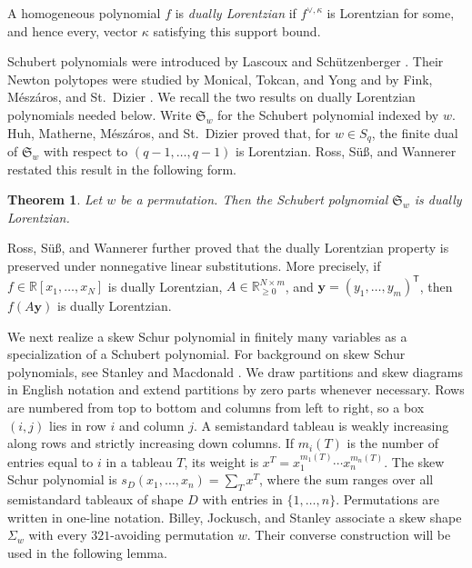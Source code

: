 \documentclass[11pt]{article}
\newtheorem{theorem}{Theorem}[section]
\theoremstyle{definition}
\newcommand{\Schubert}{\mathfrak S}
\newcommand{\R}{\mathbb R}
\begin{document}
A homogeneous polynomial $f$ is \emph{dually Lorentzian} if
$f^{\vee,\kappa}$ is Lorentzian for some, and hence every, vector $\kappa$
satisfying this support bound.

Schubert polynomials were introduced by Lascoux and Sch\"utzenberger
\cite{LS}.  Their Newton polytopes were studied by Monical, Tokcan, and Yong
\cite{MTY} and by Fink, M\'esz\'aros, and St.~Dizier \cite{FMSD}.  We recall
the two results on dually Lorentzian polynomials needed below.  Write
$\Schubert_w$ for the Schubert polynomial indexed by $w$.  Huh, Matherne,
M\'esz\'aros, and St.~Dizier \cite[Theorem~6]{HMMSD} proved that, for
$w\in S_q$, the finite dual of $\Schubert_w$ with respect to
$(q-1,\ldots,q-1)$ is Lorentzian.  Ross, S\"u\ss, and Wannerer
\cite[Theorem~4.5]{RSW} restated this result in the following form.

\begin{theorem}\label{thm:schubert-dual}
Let $w$ be a permutation.  Then the Schubert polynomial $\Schubert_w$ is
dually Lorentzian.
\end{theorem}

Ross, S\"u\ss, and Wannerer \cite[Theorem~5.12]{RSW} further proved that the
dually Lorentzian property is preserved under nonnegative linear
substitutions.  More precisely, if
$f\in\R[x_1,\ldots,x_N]$ is dually Lorentzian,
$A\in\R_{\ge0}^{N\times m}$, and
$\mathbf y=(y_1,\ldots,y_m)^{\mathsf T}$, then
$f(A\mathbf y)$ is dually Lorentzian.

We next realize a skew Schur polynomial in finitely many variables as a
specialization of a Schubert polynomial.  For background on skew Schur
polynomials, see Stanley \cite[Chapter~7]{StanleyEC2} and Macdonald
\cite[Chapter~I]{Macdonald}.  We draw partitions and skew diagrams in English
notation and extend partitions by zero parts whenever necessary.  Rows are
numbered from top to bottom and columns from left to right, so a box $(i,j)$
lies in row $i$ and column $j$.  A
semistandard tableau is weakly increasing along rows and strictly increasing
down columns.  If $m_i(T)$ is the number of entries equal to $i$ in a
tableau $T$, its weight is $x^T=x_1^{m_1(T)}\cdots x_n^{m_n(T)}$.  The skew
Schur polynomial is $s_D(x_1,\ldots,x_n)=\sum_T x^T$, where the sum ranges
over all semistandard tableaux of shape $D$ with entries in
$\{1,\ldots,n\}$.  Permutations are written in one-line notation.  Billey,
Jockusch, and Stanley \cite[Proposition~2.1]{BJS} associate a skew shape
$\Sigma_w$ with every $321$-avoiding permutation $w$.  Their converse
construction \cite[Proposition~2.2]{BJS} will be used in the following lemma.
\end{document}
